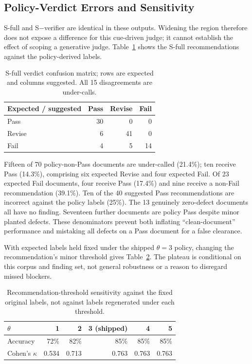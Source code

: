 \documentclass[computers,article,submit,moreauthors]{Definitions/mdpi}
\begin{document}
\subsection{Policy-Verdict Errors and Sensitivity}\label{sec:threshold}

S-full and S$-$verifier are identical in these outputs. Widening the region therefore does not expose a difference for this cue-driven judge; it cannot establish the effect of scoping a generative judge. Table~\ref{tab:confusion} shows the S-full recommendations against the policy-derived labels.

\begin{table}[!ht]
\caption{S-full verdict confusion matrix; rows are expected and columns suggested. All 15 disagreements are under-calls.}
\label{tab:confusion}
\centering\small
\begin{tabular}{@{}lrrr@{}}
\toprule
Expected / suggested & Pass & Revise & Fail \\
\midrule
Pass & 30 & 0 & 0 \\
Revise & 6 & 41 & 0 \\
Fail & 4 & 5 & 14 \\
\bottomrule
\end{tabular}
\end{table}

Fifteen of 70 policy-non-Pass documents are under-called (21.4\%); ten receive Pass (14.3\%), comprising six expected Revise and four expected Fail. Of 23 expected Fail documents, four receive Pass (17.4\%) and nine receive a non-Fail recommendation (39.1\%). Ten of the 40 suggested Pass recommendations are incorrect against the policy labels (25\%). The 13 genuinely zero-defect documents all have no finding. Seventeen further documents are policy Pass despite minor planted defects. These denominators prevent both inflating ``clean-document'' performance and mistaking all defects on a Pass document for a false clearance.

With expected labels held fixed under the shipped $\theta=3$ policy, changing the recommendation's minor threshold gives Table~\ref{tab:theta}. The plateau is conditional on this corpus and finding set, not general robustness or a reason to disregard missed blockers.

\begin{table}[!ht]
\caption{Recommendation-threshold sensitivity against the fixed original labels, not against labels regenerated under each threshold.}
\label{tab:theta}
\centering\footnotesize
\begin{tabular}{@{}lrrrrr@{}}
\toprule
$\theta$ & 1 & 2 & 3 (shipped) & 4 & 5 \\
\midrule
Accuracy & 72\% & 82\% & 85\% & 85\% & 85\% \\
Cohen's $\kappa$ & 0.534 & 0.713 & 0.763 & 0.763 & 0.763 \\
\bottomrule
\end{tabular}
\end{table}
\end{document}
